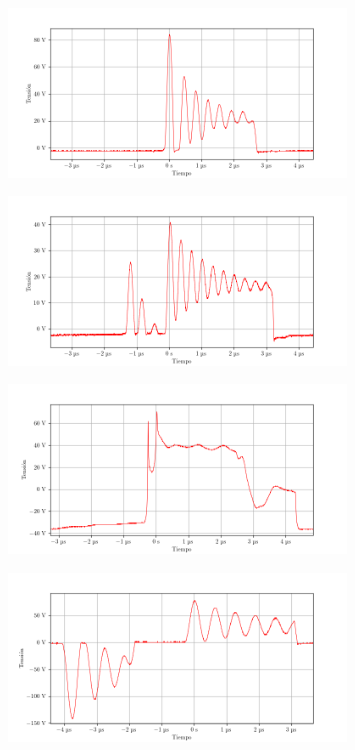 \begin{figure}[ht]
    \centering
    \includegraphics[width=0.8\textwidth]{images/capturas-osciloscopio/17-11-2022/53.png}
    \caption{}
    \label{fig:osc:53}
\end{figure}

\begin{figure}[ht]
    \centering
    \includegraphics[width=0.8\textwidth]{images/capturas-osciloscopio/17-11-2022/54.png}
    \caption{}
    \label{fig:osc:54}
\end{figure}

\begin{figure}[ht]
    \centering
    \includegraphics[width=0.8\textwidth]{images/capturas-osciloscopio/17-11-2022/55.png}
    \caption{}
    \label{fig:osc:55}
\end{figure}

\begin{figure}[ht]
    \centering
    \includegraphics[width=0.8\textwidth]{images/capturas-osciloscopio/17-11-2022/56.png}
    \caption{}
    \label{fig:osc:56}
\end{figure}

